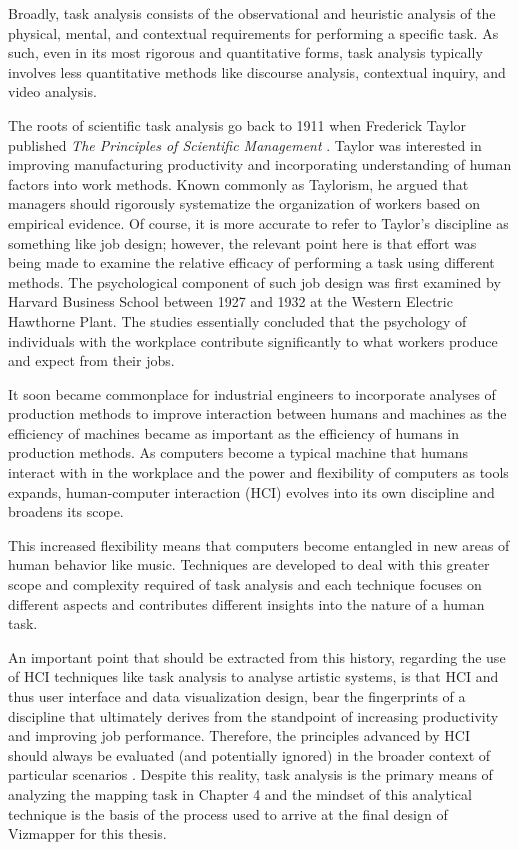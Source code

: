 Broadly, task analysis consists of the observational and heuristic analysis of the physical, mental, and contextual requirements for performing a specific task. As such, even in its most rigorous and quantitative forms, task analysis typically involves less quantitative methods like discourse analysis, contextual inquiry, and video analysis. 

The roots of scientific task analysis go back to 1911 when Frederick Taylor published \emph{The Principles of Scientific Management} \cite{crystal2004}. Taylor was interested in improving manufacturing productivity and incorporating understanding of human factors into work methods. Known commonly as Taylorism, he argued that managers should rigorously systematize the organization of workers based on empirical evidence. Of course, it is more accurate to refer to Taylor's discipline as something like job design; however, the relevant point here is that effort was being made to examine the relative efficacy of performing a task using different methods. The psychological component of such job design was first examined by Harvard Business School between 1927 and 1932 at the Western Electric Hawthorne Plant. The studies essentially concluded that the psychology of individuals with the workplace contribute significantly to what workers produce and expect from their jobs.

It soon became commonplace for industrial engineers to incorporate analyses of production methods to improve interaction between humans and machines as the efficiency of machines became as important as the efficiency of humans in production methods. As computers become a typical machine that humans interact with in the workplace and the power and flexibility of computers as tools expands, human-computer interaction (HCI) evolves into its own discipline and broadens its scope. 

This increased flexibility means that computers become entangled in new areas of human behavior like music. Techniques are developed to deal with this greater scope and complexity required of task analysis and each technique focuses on different aspects and contributes different insights into the nature of a human task.

An important point that should be extracted from this history, regarding the use of HCI techniques like task analysis to analyse artistic systems, is that HCI and thus user interface and data visualization design, bear the fingerprints of a discipline that ultimately derives from the standpoint of increasing productivity and improving job performance. Therefore, the principles advanced by HCI should always be evaluated (and potentially ignored) in the broader context of particular scenarios \cite{orio2002}. Despite this reality, task analysis is the primary means of analyzing the mapping task in Chapter 4 and the mindset of this analytical technique is the basis of the process used to arrive at the final design of Vizmapper for this thesis.

